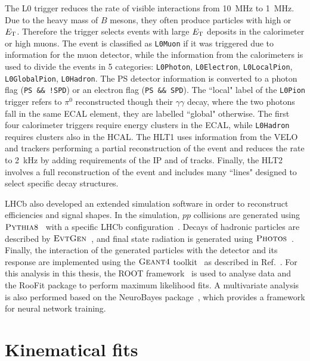 The L0 trigger reduces the rate of visible interactions from 10~MHz to 1~MHz.
Due to the heavy mass of $B$ mesons, they often produce particles with high \pt or $E_{\rm T}$.
Therefore the trigger selects events with large $E_{\rm T}$ deposits in the calorimeter
or high \pt muons. The event is classified as \verb!L0Muon! if it was triggered due to information
for the muon detector, while the information from the calorimeters is used to divide the
events in 5 categories: \verb!L0Photon!, \verb!L0Electron!, \verb!L0LocalPion!, 
\verb!L0GlobalPion!, \verb!L0Hadron!. The PS detector information is converted to a photon flag 
(\verb|PS && !SPD|) or an electron flag (\verb|PS && SPD|). The ``local" label of the \verb!L0Pion! trigger 
refers to $\pi^0$ reconstructed though their $\gamma\gamma$ decay, where the two photons fall in the 
same ECAL element, they are labelled ``global" otherwise. The first four calorimeter triggers require 
energy clusters in the ECAL, while \verb!L0Hadron! requires clusters also in the HCAL. 
The HLT1 uses information from the VELO and trackers performing a partial reconstruction 
of the event and reduces the rate to 2~kHz by adding requirements of the IP and \chisq of tracks.
Finally, the HLT2 involves a full reconstruction of the event and includes many ``lines" designed 
to select specific decay structures.

LHCb also developed an extended simulation software in order to reconstruct efficiencies and signal shapes.
In the simulation, $pp$ collisions are generated using $\textsc{Pythia}8$~\cite{Sjostrand:2006za,Sjostrand:2007gs} with a specific
LHCb configuration~\cite{LHCb-PROC-2010-056}. Decays of hadronic particles are described by $\textsc{EvtGen}$~\cite{Lange:2001uf},
and final state radiation is generated using $\textsc{Photos}$~\cite{Golonka:2005pn}. Finally, the interaction of the generated
particles with the detector and its response are implemented using the $\textsc{Geant4}$ toolkit~\cite{Allison:2006ve}
as described in Ref.~\cite{LHCb-PROC-2011-006}. For this analysis in this thesis, the ROOT framework~\cite{Brun:2000es} is
used to analyse data and the RooFit package to perform maximum likelihood fits. A multivariate analysis is also performed
based on the NeuroBayes package~\cite{Feindt:2006pm,feindt-2004}, which provides a framework for neural network training.

\section{Kinematical fits}
\label{sec:DTF}


